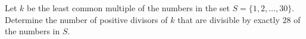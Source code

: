 Let $k$ be the least common multiple of the numbers in the set $S=\{1,2,\dots,30\}$. Determine the number of positive divisors of $k$ that are divisible by exactly $28$ of the numbers in $S$.
